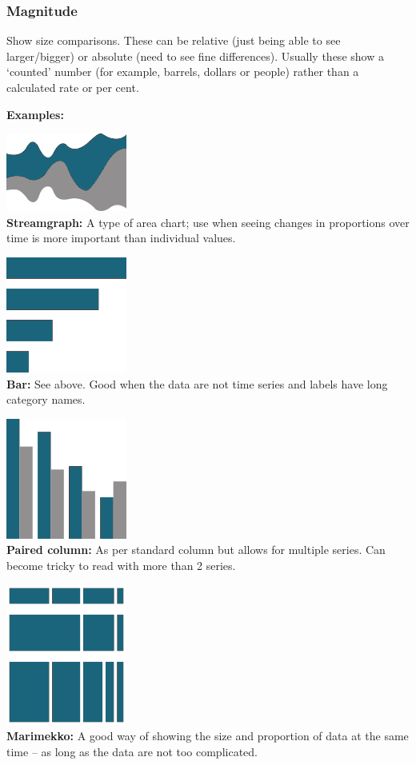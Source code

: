 \documentclass[
  a4paper,
  onecolumn,
  oneside]{book}
\begin{document}
\hypertarget{magnitude}{%
\subsubsection{Magnitude}\label{magnitude}}

Show size comparisons. These can be relative (just being able to see
larger/bigger) or absolute (need to see fine differences). Usually these
show a `counted' number (for example, barrels, dollars or people) rather
than a calculated rate or per cent.

\textbf{Examples:}

\includegraphics{part1/images/changeovertime11.png}\\
\textbf{Streamgraph:} A type of area chart; use when seeing changes in
proportions over time is more important than individual values.

\includegraphics{part1/images/magnitude1.png}\\
\textbf{Bar:} See above. Good when the data are not time series and
labels have long category names.

\includegraphics{part1/images/magnitude2.png}\\
\textbf{Paired column:} As per standard column but allows for multiple
series. Can become tricky to read with more than 2 series.

\includegraphics{part1/images/magnitude3.png}\\
\textbf{Marimekko:} A good way of showing the size and proportion of
data at the same time -- as long as the data are not too complicated.
\end{document}
